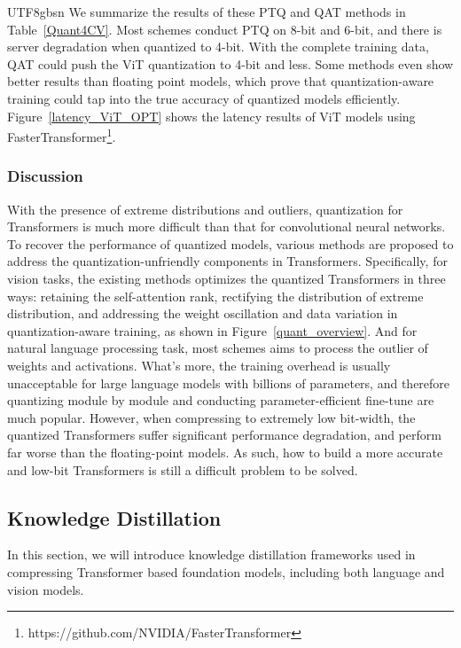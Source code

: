 \documentclass[10pt,journal,compsoc]{IEEEtran}
\newcommand{\<}{\left\langle}
\renewcommand{\>}{\right\rangle}
\newcommand{\1}{\mathbbm{1}}
\begin{document}
\begin{CJK}{UTF8}{gbsn}
We summarize the results of these PTQ and QAT methods in Table~\ref{Quant4CV}. Most schemes conduct PTQ on 8-bit and 6-bit, and there is server degradation when quantized to 4-bit. With the complete training data, QAT could push the ViT quantization to 4-bit and less. Some methods even show better results than floating point models, which prove that quantization-aware training could tap into the true accuracy of quantized models efficiently. Figure~\ref{latency_ViT_OPT} shows the latency results of ViT models using FasterTransformer\footnote{https://github.com/NVIDIA/FasterTransformer}.

\subsubsection{Discussion}
With the presence of extreme distributions and outliers, quantization for Transformers is much more difficult than that for convolutional neural networks. To recover the performance of quantized models, various methods are proposed to address the quantization-unfriendly components in Transformers. Specifically, for vision tasks, the existing methods optimizes the quantized Transformers in three ways: retaining the self-attention rank, rectifying the distribution of extreme distribution, and addressing the weight oscillation and data variation in quantization-aware training, as shown in Figure~\ref{quant_overview}. And for natural language processing task, most schemes aims to process the outlier of weights and activations. What's more, the training overhead is usually unacceptable for large language models with billions of parameters, and therefore quantizing module by module and conducting parameter-efficient fine-tune are much popular. However, when compressing to extremely low bit-width, the quantized Transformers suffer significant performance degradation, and perform far worse than the floating-point models. As such, how to build a more accurate and low-bit Transformers is still a difficult problem to be solved.  





\subsection{Knowledge Distillation}

In this section, we will introduce knowledge distillation frameworks used in compressing Transformer based foundation models, including both language and vision models.


\end{CJK}
\end{document}
